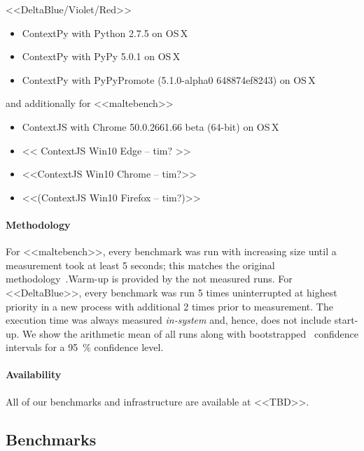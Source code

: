 \documentclass[preprint,english,10pt,nonatbib]{sigplanconf}
\begin{document}
<<DeltaBlue/Violet/Red>>
\begin{itemize}
\item ContextPy with Python 2.7.5 on OS\,X
\item ContextPy with PyPy 5.0.1 on OS\,X
\item ContextPy with PyPyPromote (5.1.0-alpha0 648874ef8243) on OS\,X
\end{itemize}

and additionally for <<maltebench>>
\begin{itemize}
\item ContextJS with Chrome 50.0.2661.66 beta (64-bit) on OS\,X
\item << ContextJS Win10 Edge -- tim? >>
\item <<ContextJS Win10 Chrome -- tim?>>
\item <<(ContextJS Win10 Firefox -- tim?)>>
\end{itemize}

\paragraph{Methodology} 
For <<maltebench>>, every benchmark was run with increasing size until a
measurement took at least 5 seconds; this matches the original
methodology~\cite{appeltauer+:2009:comparison-context-oriented}.Warm-up is
provided by the not measured runs.
For <<DeltaBlue>>, every benchmark was run 5 times uninterrupted at highest
priority in a new process with additional 2 times prior to measurement.
The execution time was always measured \emph{in-system} and, hence, does not include start-up.
We show the arithmetic mean of all  runs along with
bootstrapped~\cite{davison+:1997:confidence-intervals} confidence intervals
for a \SI{95}{\percent} confidence level.


\paragraph{Availability}  All of our benchmarks and infrastructure
 are available at <<TBD>>.


\subsection{Benchmarks}
\end{document}
